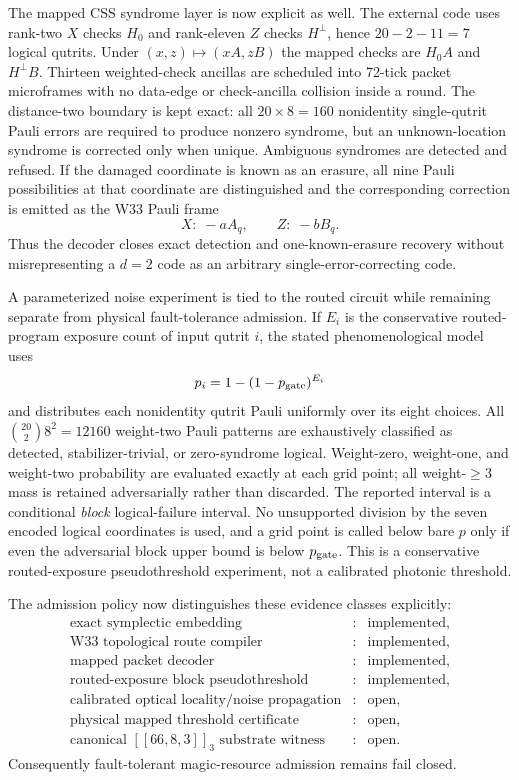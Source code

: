 The mapped CSS syndrome layer is now explicit as well.  The external code uses
rank-two $X$ checks $H_0$ and rank-eleven $Z$ checks $H^\perp$, hence
$20-2-11=7$ logical qutrits.  Under $(x,z)\mapsto(xA,zB)$ the mapped checks are
$H_0A$ and $H^\perp B$.  Thirteen weighted-check ancillas are scheduled into
72-tick packet microframes with no data-edge or check-ancilla collision inside a
round.  The distance-two boundary is kept exact: all $20\times8=160$
nonidentity single-qutrit Pauli errors are required to produce nonzero syndrome,
but an unknown-location syndrome is corrected only when unique.  Ambiguous
syndromes are detected and refused.  If the damaged coordinate is known as an
erasure, all nine Pauli possibilities at that coordinate are distinguished and
the corresponding correction is emitted as the W33 Pauli frame
\[
  X:\;-aA_q,
  \qquad
  Z:\;-bB_q.
\]
Thus the decoder closes exact detection and one-known-erasure recovery without
misrepresenting a $d=2$ code as an arbitrary single-error-correcting code.

A parameterized noise experiment is tied to the routed circuit while remaining
separate from physical fault-tolerance admission.  If $E_i$ is the conservative
routed-program exposure count of input qutrit $i$, the stated phenomenological
model uses
\[
  p_i=1-(1-p_{\rm gate})^{E_i}
\]
and distributes each nonidentity qutrit Pauli uniformly over its eight choices.
All ${20\choose2}8^2=12160$ weight-two Pauli patterns are exhaustively classified
as detected, stabilizer-trivial, or zero-syndrome logical.  Weight-zero,
weight-one, and weight-two probability are evaluated exactly at each grid point;
all weight-$\ge3$ mass is retained adversarially rather than discarded.  The
reported interval is a conditional \emph{block} logical-failure interval.  No
unsupported division by the seven encoded logical coordinates is used, and a
grid point is called below bare $p$ only if even the adversarial block upper
bound is below $p_{\rm gate}$.  This is a conservative routed-exposure
pseudothreshold experiment, not a calibrated photonic threshold.

The admission policy now distinguishes these evidence classes explicitly:
\[
\begin{array}{rcl}
\text{exact symplectic embedding} &:& \text{implemented},\\
\text{W33 topological route compiler} &:& \text{implemented},\\
\text{mapped packet decoder} &:& \text{implemented},\\
\text{routed-exposure block pseudothreshold} &:& \text{implemented},\\
\text{calibrated optical locality/noise propagation} &:& \text{open},\\
\text{physical mapped threshold certificate} &:& \text{open},\\
\text{canonical }[[66,8,3]]_3\text{ substrate witness} &:& \text{open}.
\end{array}
\]
Consequently fault-tolerant magic-resource admission remains fail closed.


